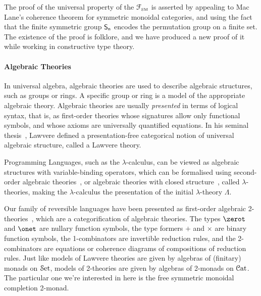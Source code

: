 The proof of the universal property of the $\FSM$ is asserted by appealing to Mac Lane's coherence theorem for symmetric
monoidal categories, and using the fact that the finite symmetric group $\Sn$ encodes the permutation group on a finite
set. The existence of the proof is folklore, and we have produced a new proof of it while working in constructive type
theory.

\paragraph{Algebraic Theories} In universal algebra, algebraic theories are used to describe algebraic structures, such
as groups or rings. A specific group or ring is a model of the appropriate algebraic theory. Algebraic theories are
usually \emph{presented} in terms of logical syntax, that is, as first-order theories whose signatures allow only
functional symbols, and whose axioms are universally quantified equations. In his seminal
thesis~\cite{lawvereFUNCTORIALSEMANTICSALGEBRAIC1963}, Lawvere defined a presentation-free categorical notion of
universal algebraic structure, called a Lawvere theory.

Programming Languages, such as the $\lambda$-calculus, can be viewed as algebraic structures with variable-binding
operators, which can be formalised using second-order algebraic theories~\cite{fioreSecondOrderAlgebraicTheories2010},
or algebraic theories with closed structure~\cite{hylandClassicalLambdaCalculus2017}, called $\lambda$-theories, making
the $\lambda$-calculus the presentation of the initial $\lambda$-theory $\Lambda$.

Our family of reversible languages have been presented as first-order algebraic
2-theories~\cite{cohenCoherenceRewriting2theories2009,bekeCategorificationTermRewriting2011,yanofskySyntaxCoherence2000},
which are a categorification of algebraic theories. The types $\zerot$ and $\onet$ are nullary function symbols, the
type formers $+$ and $\times$ are binary function symbols, the 1-combinators are invertible reduction rules, and the
2-combinators are equations or coherence diagrams of compositions of reduction rules. Just like models of Lawvere
theories are given by algebras of (finitary) monads on $\SetCat$, models of 2-theories are given by algebras of 2-monads
on $\CatCat$. The particular one we're interested in here is the free symmetric monoidal completion 2-monad.



